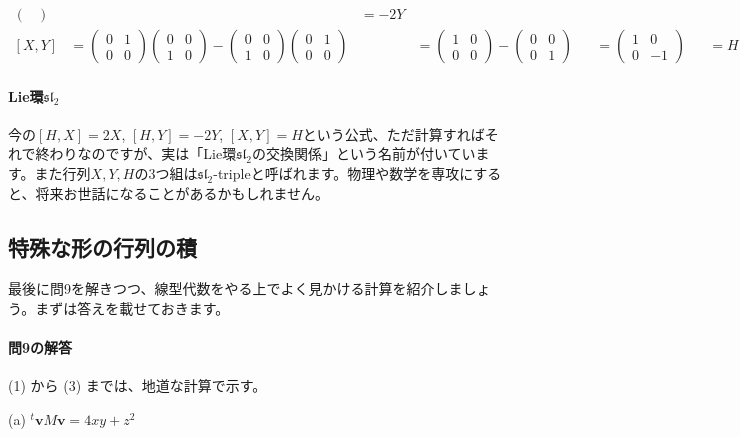 \begin{align*}
\begin{pmatrix}
\end{pmatrix}
& &= -2Y \\
[X, Y]
&=
\begin{pmatrix}
0 & 1 \\
0 & 0
\end{pmatrix}
\begin{pmatrix}
0 & 0 \\
1 & 0
\end{pmatrix}
-
\begin{pmatrix}
0 & 0 \\
1 & 0
\end{pmatrix}
\begin{pmatrix}
0 & 1 \\
0 & 0
\end{pmatrix}
& &=
\begin{pmatrix}
1 & 0 \\
0 & 0
\end{pmatrix}
-
\begin{pmatrix}
0 & 0 \\
0 & 1
\end{pmatrix}
& &=
\begin{pmatrix}
1 & 0 \\
0 & -1
\end{pmatrix}
& &= H
\end{align*}

\paragraph{Lie環$\mathfrak{sl}_2$}
今の$[H, X] = 2X$, $[H, Y] = -2Y$, $[X, Y] = H$という公式、ただ計算すればそれで終わりなのですが、実は「Lie環$\mathfrak{sl}_2$の交換関係」という名前が付いています。また行列$X, Y, H$の$3$つ組は$\mathfrak{sl}_2$-tripleと呼ばれます。物理や数学を専攻にすると、将来お世話になることがあるかもしれません。

\subsection{特殊な形の行列の積}

最後に問9を解きつつ、線型代数をやる上でよく見かける計算を紹介しましょう。まずは答えを載せておきます。

\paragraph{問9の解答} (1) から (3) までは、地道な計算で示す。

\noindent (a) ${}^t\bm{v}M\bm{v} = 4xy + z^2$ 


